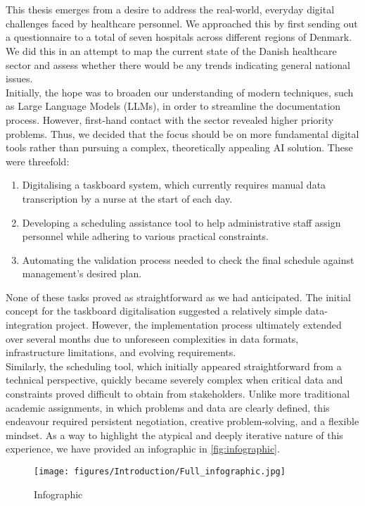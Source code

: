\\
\\
This thesis emerges from a desire to address the real-world, everyday digital challenges faced by healthcare personnel. We approached this by first sending out a questionnaire to a total of seven hospitals across different regions of Denmark. We did this in an attempt to map the current state of the Danish healthcare sector and assess whether there would be any trends indicating general national issues.
\\
Initially, the hope was to broaden our understanding of modern techniques, such as Large Language Models (LLMs), in order to streamline the documentation process. However, first-hand contact with the sector revealed higher priority problems. Thus, we decided that the focus should be on more fundamental digital tools rather than pursuing a complex, theoretically appealing AI solution. These were threefold:
\begin{enumerate}
    \item Digitalising a taskboard system, which currently requires manual data transcription by a nurse at the start of each day.
    \item Developing a scheduling assistance tool to help administrative staff assign personnel while adhering to various practical constraints.
    \item Automating the validation process needed to check the final schedule against management's desired plan.
\end{enumerate}
None of these tasks proved as straightforward as we had anticipated. The initial concept for the taskboard digitalisation suggested a relatively simple data-integration project. However, the implementation process ultimately extended over several months due to unforeseen complexities in data formats, infrastructure limitations, and evolving requirements.
\\
Similarly, the scheduling tool, which initially appeared straightforward from a technical perspective, quickly became severely complex when critical data and constraints proved difficult to obtain from stakeholders. Unlike more traditional academic assignments, in which problems and data are clearly defined, this endeavour required persistent negotiation, creative problem-solving, and a flexible mindset. As a way to highlight the atypical and deeply iterative nature of this experience, we have provided an infographic in \autoref{fig:infographic}.

\begin{figure}[H]
    \centering
    \texttt{[image: figures/Introduction/Full\_infographic.jpg]}
    \caption{Infographic}
    \label{fig:infographic}
\end{figure}

